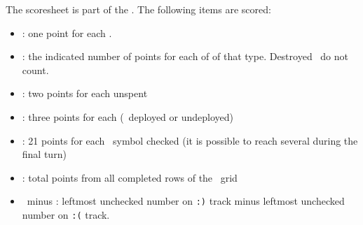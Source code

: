 The scoresheet is part of the \planetsheet.  The following items are scored:
\begin{itemize}
  \item \astronauts: one point for each \astronaut.
  \item \armaments: the indicated number of points for each of \armament of that type. Destroyed \armaments\ do not count.
  \item \currency: two points for each unspent \currency
  \item \squadrons: three points for each (\squadron\ deployed or undeployed)
  \item \mastery: 21 points for each \masterysymbol\ symbol checked (it is possible to reach several during the final turn)
  \item \culture: total points from all completed rows of the \culture\ grid
  \item \happiness\ minus \unhappiness: leftmost unchecked number on \texttt{:)} track minus leftmost unchecked number on \texttt{:(} track.
\end{itemize}

